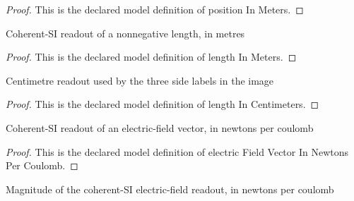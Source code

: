 \begin{proof}
  This is the declared model definition of position In Meters.
\end{proof}
\begin{definition}
  \label{def:physics:phyx-mini-0903:phyxminiproblems-problemphyxmini0903-lengthinmeters}
  Coherent-SI readout of a nonnegative length, in metres
\end{definition}
\begin{proof}
  This is the declared model definition of length In Meters.
\end{proof}
\begin{definition}
  \label{def:physics:phyx-mini-0903:phyxminiproblems-problemphyxmini0903-lengthincentimeters}
  Centimetre readout used by the three side labels in the image
\end{definition}
\begin{proof}
  This is the declared model definition of length In Centimeters.
\end{proof}
\begin{definition}
  \label{def:physics:phyx-mini-0903:phyxminiproblems-problemphyxmini0903-electricfieldvectorinnewtonspercoulomb}
  Coherent-SI readout of an electric-field vector, in newtons per coulomb
\end{definition}
\begin{proof}
  This is the declared model definition of electric Field Vector In Newtons Per Coulomb.
\end{proof}
\begin{definition}
  \label{def:physics:phyx-mini-0903:phyxminiproblems-problemphyxmini0903-electricfieldmagnitudeinnewtonspercoulomb}
  Magnitude of the coherent-SI electric-field readout, in newtons per coulomb
\end{definition}
